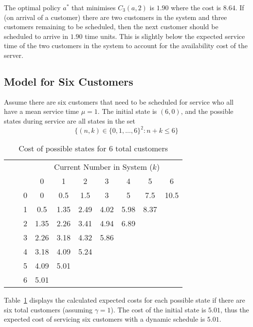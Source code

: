 The optimal policy $a^{*}$ that minimises $C_{3} (a, 2)$ is $1.90$ where the cost is $8.64$. If (on arrival of a customer) there are two customers in the system and three customers remaining to be scheduled, then the next customer should be scheduled to arrive in $1.90$ time units. This is slightly below the expected service time of the two customers in the system to account for the availability cost of the server.

\subsection{Model for Six Customers}
Assume there are six customers that need to be scheduled for service who all have a mean service time $\mu = 1$. The initial state is $(6, 0)$, and the possible states during service are all states in the set
\begin{equation}
	\Big\{ (n, k) \in \{ 0, 1, \ldots, 6 \}^{2} : n + k \leq 6 \Big\}
\end{equation}

\begin{table}[htb]
	\centering
	\begin{tabular}{c c c || c | c | c | c | c | c | c}
		& & & \multicolumn{7}{c}{Current Number in System ($k$)} \\
		& & & 0 & 1 & 2 & 3 & 4 & 5 & 6 \\ \hline \hline
		\parbox[t]{2mm}{} & \parbox[t]{2mm}{} & 0 & 0 & 0.5 & 1.5 & 3 & 5 & 7.5 & 10.5 \\
		& & 1 & 0.5 & 1.35 & 2.49 & 4.02 & 5.98 & 8.37 \\
		& & 2 & 1.35 & 2.26 & 3.41 & 4.94 & 6.89 & \\
		& & 3 & 2.26 & 3.18 & 4.32 & 5.86 & & \\
		& & 4 & 3.18 & 4.09 & 5.24 & & & \\
		& & 5 & 4.09 & 5.01 & & & & \\
		& & 6 & 5.01 & & & & &
	\end{tabular}
	\caption{Cost of possible states for 6 total customers}
	\label{Cost_6_Customers}
\end{table}

Table~\ref{Cost_6_Customers} displays the calculated expected costs for each possible state if there are six total customers (assuming $\gamma = 1$). The cost of the initial state is $5.01$, thus the expected cost of servicing six customers with a dynamic schedule is $5.01$.


